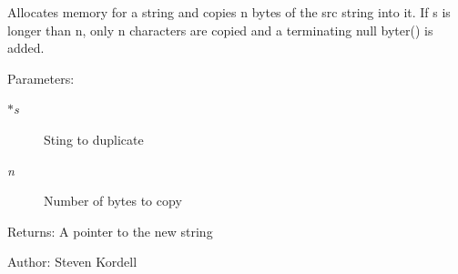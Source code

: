 Allocates memory for a string and copies n bytes of the src string into it. If s is longer than n, only n characters are copied and a terminating null byter() is added. \begin{Desc}
\item[Parameters:]
\begin{description}
\item[{\em $\ast$s}]Sting to duplicate \item[{\em n}]Number of bytes to copy \end{description}
\end{Desc}
\begin{Desc}
\item[Returns:]A pointer to the new string \end{Desc}
\begin{Desc}
\item[Author:]Steven Kordell \end{Desc}
